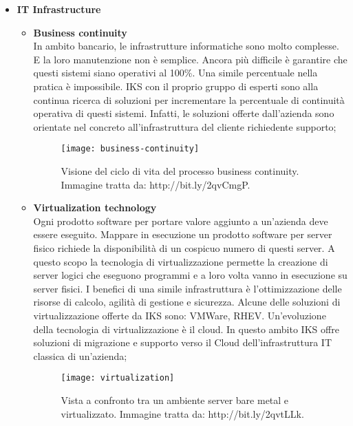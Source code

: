 \begin{itemize}
\begin{itemize}
	 \end{itemize}	
	\item \textbf{IT Infrastructure}\\
	 \begin{itemize}
	 	\item \textbf{Business continuity}\\
	 	In ambito bancario, le infrastrutture informatiche sono molto complesse. E la loro manutenzione 
	 	non è semplice. Ancora più difficile è garantire che questi sistemi siano operativi al 100\%. 
	 	Una simile percentuale nella pratica è impossibile. IKS con il proprio gruppo di esperti 
	 	sono alla continua ricerca di soluzioni per incrementare la percentuale di continuità operativa 
	 	di questi sistemi. Infatti, le soluzioni offerte dall'azienda sono orientate nel concreto all'infrastruttura 
	 	del cliente richiedente supporto;
	 	\begin{figure}[htbp]
	 		\begin{center}
	 			\texttt{[image: business-continuity]}
	 			\caption{Visione del ciclo di vita del processo business continuity. Immagine tratta da: http://bit.ly/2qvCmgP.}
	 		\end{center}
	 	\end{figure}
	 \newpage
	 	
	 	\item \textbf{Virtualization technology}\\
	 	Ogni prodotto software per portare valore aggiunto a un'azienda deve essere eseguito. Mappare in 
	 	esecuzione un prodotto software per server fisico richiede la disponibilità di un cospicuo numero 
	 	di questi server. A questo scopo la tecnologia di virtualizzazione permette la creazione di server logici 
	 	che eseguono programmi e a loro volta vanno in esecuzione su server fisici. I benefici di una simile 
	 	infrastruttura è l'ottimizzazione delle risorse di calcolo, agilità di gestione e sicurezza. Alcune 
	 	delle soluzioni di virtualizzazione offerte da IKS sono: VMWare, RHEV. Un'evoluzione della tecnologia 
	 	di virtualizzazione è il cloud. In questo ambito IKS offre soluzioni di migrazione e supporto verso 
	 	il Cloud dell'infrastruttura IT classica di un'azienda;  
		\begin{figure}[htbp]
			\begin{center}
				\texttt{[image: virtualization]}
				\caption{Vista a confronto tra un ambiente server bare metal e virtualizzato. Immagine tratta da: http://bit.ly/2qvtLLk.}
			\end{center}
		\end{figure}
		

\end{itemize}
\end{itemize}
